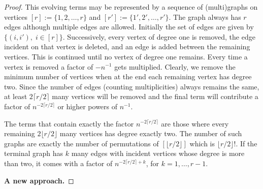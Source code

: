 \documentclass[10pt,a4paper]{amsart}
\begin{document}
\begin{proof}
This evolving terms may be represented by a sequence of (multi)graphs on vertices $[r]:=\{1,2,\ldots, r\}$ and $[r']:=\{1', 2', \ldots, r'\}$. The graph always has $r$ edges although multiple edges are allowed. Initially the set of edges are given by $\{(i,i'),\; i \in [r]\}$. Successively, every vertex of degree one is removed, the edge incident on that vertex is deleted, and an edge is added between the remaining vertices. This is continued until no vertex of degree one remains. Every time a vertex is removed a factor of $-n^{-1}$ gets multiplied. Clearly, we remove the minimum number of vertices when at the end each remaining vertex has degree two. Since the number of edges (counting multiplicities) always remains the same, at least $2\lceil r/2 \rceil$ many vertices will be removed and the final term will contribute a factor of $n^{-2\lceil r/2 \rceil}$ or higher powers of $n^{-1}$. 

The terms that contain exactly the factor $n^{-2\lceil r/2 \rceil}$ are those where every remaining $2\lfloor r/2 \rfloor$ many vertices has degree exactly two. The number of such graphs are exactly the number of permutations of $[\lfloor r/2 \rfloor]$ which is $\lfloor r/2 \rfloor !$. If the terminal graph has $k$ many edges with incident vertices whose degree is more than two, it comes with a factor of $n^{-2\lceil r/2 \rceil + k}$, for $k=1, \ldots, r-1$. 

\newpage

\textbf{A new approach.}


\end{proof}
\end{document}

